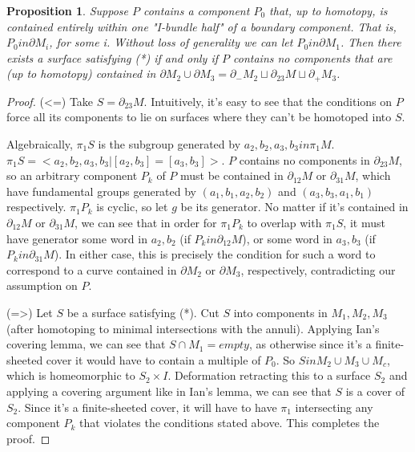 \documentclass[12pt]{amsart}
\newtheorem{prop}[theorem]{Proposition}
\theoremstyle{definition}
\newcommand{\x}{\times}
\newcommand{\bd}{\partial}
\begin{document}
\begin{prop}

Suppose $P$ contains a component $P_0$ that, up to homotopy, is
contained entirely within one "I-bundle half" of a boundary component. That is,
$P_0 in \bd M_i$, for some i. Without loss of generality we can let $P_0 in
\bd M_1$. Then
there exists a surface satisfying (*) if and only if $P$ contains no components
that are (up to homotopy) contained in $\bd M_2 \cup \bd M_3 = \bd_-M_2 \sqcup
\bd_{23}M \sqcup \bd_+M_3$.

\end{prop}
\begin{proof}

(<=) Take $S=\bd_{23}M$. Intuitively, it's easy to see that the conditions on
$P$ force all its components to lie on surfaces where they can't be homotoped
into $S$.

Algebraically, $\pi_1S$ is the subgroup generated by $a_2,b_2,a_3,b_3 in
\pi_1M$. $\pi_1S = <a_2,b_2,a_3,b_3 | [a_2,b_3]=[a_3,b_3]>$. $P$ contains no
components in $\bd_{23}M$, so an arbitrary component $P_k$ of $P$  must be
contained in $\bd_{12}M$ or $\bd_{31}M$, which have fundamental groups
generated by $(a_1,b_1,a_2,b_2)$ and $(a_3,b_3,a_1,b_1)$ respectively.
$\pi_1P_k$ is cyclic, so let $g$ be its generator. No matter if it's contained
in $\bd_{12}M$ or $\bd_{31}M$, we can see that in order for $\pi_1P_k$ to
overlap with $\pi_1S$, it must have generator some word in $a_2,b_2$ (if $P_k
in \bd_{12}M$), or some word in $a_3,b_3$ (if $P_k in \bd_{31}M$). In either
case, this is precisely the condition for such a word to correspond to a curve
contained in $\bd M_2$ or $\bd M_3$, respectively, contradicting our assumption
on $P$.

(=>) Let $S$ be a surface satisfying (*). Cut $S$ into components in
$M_1,M_2,M_3$ (after homotoping to minimal intersections with the annuli).
Applying Ian's covering lemma, we can see that $S \cap M_1 = empty$, as
otherwise since it's a finite-sheeted cover it would have to contain a multiple
of $P_0$.  So $S in M_2 \cup M_3 \cup M_c$, which is homeomorphic to $S_2 \x
I$. Deformation retracting this to a surface $S_2$ and applying a covering
argument like in Ian's lemma, we can see that $S$ is a cover of $S_2$. Since
it's a finite-sheeted cover, it will have to have $\pi_1$ intersecting any
component $P_k$ that violates the conditions stated above. This completes the
proof.

\end{proof}
\end{document}
